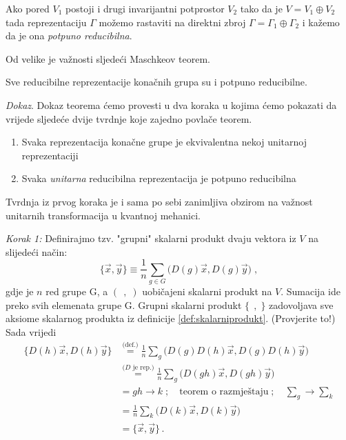 \begin{definicija}
Ako pored $V_1$ postoji i drugi invarijantni potprostor $V_2$ 
tako da je $V=V_1 \oplus V_2$ tada reprezentaciju $\Gamma$
možemo rastaviti na direktni zbroj $\Gamma=\Gamma_1
\oplus \Gamma_2$ i kažemo da je ona \emph{potpuno reducibilna}.
\end{definicija}

Od velike je važnosti sljedeći Maschkeov teorem.

\begin{teorem}[Maschke]
Sve reducibilne reprezentacije konačnih grupa su i potpuno reducibilne.
\end{teorem}

\emph{Dokaz}. Dokaz teorema ćemo provesti u dva koraka u kojima ćemo
pokazati da vrijede sljedeće dvije tvrdnje koje zajedno
povlače teorem.
\begin{enumerate}
    \item Svaka reprezentacija konačne grupe je ekvivalentna nekoj unitarnoj reprezentaciji
    \item Svaka \emph{unitarna} reducibilna reprezentacija je potpuno reducibilna
\end{enumerate}
Tvrdnja iz prvog koraka je i sama po sebi zanimljiva obzirom na važnost unitarnih transformacija
u kvantnoj mehanici.

\emph{Korak 1:} Definirajmo tzv. "grupni" skalarni produkt dvaju
vektora iz $V$ na slijedeći način:
\begin{equation*}
\{\vec{x}, \vec{y}\} \equiv \frac{1}{n}\sum_{g\in G} \big( D(g)\vec{x},
 D(g)\vec{y}\big) \;, 
\end{equation*}
gdje je $n$ red grupe G, a $(\;\,,\;)$ uobičajeni skalarni produkt na $V$.
Sumacija ide preko svih elemenata grupe G.
Grupni skalarni produkt $\{\;\,,\;\}$ zadovoljava sve aksiome skalarnog
produkta iz definicije \ref{def:skalarniprodukt}. (Provjerite to!)
Sada vrijedi
\begin{equation*}
\begin{split}
\{D(h)\vec{x}, D(h)\vec{y}\} &\stackrel{\text{(def.)}}{=} \frac{1}{n}\sum_g \big( D(g) D(h) \vec{x},
 D(g) D(h) \vec{y} \big) \\
&\stackrel{\text{($D$ je rep.)}}= \frac{1}{n}\sum_g \big( D(gh)\vec{x} , D(gh)\vec{y} \big) \\
&=  gh\to k\;;\quad \text{teorem o razmještaju}\;;\quad \sum_g \to \sum_k \\
&= \frac{1}{n}\sum_k \big( D(k) \vec{x}, D(k) \vec{y} \big) \\
&= \{\vec{x}, \vec{y}\} \,.
\end{split}
\end{equation*}

